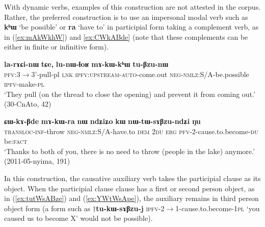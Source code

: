 \documentclass[oneside,a4paper,11pt]{article}
\newcommand{\ipa}[1]{\textbf{\phon#1}} %
\newcommand{\jpg}[2]{\ipa{#1} `#2'} %
\newcommand{\refb}[1]{(\ref{#1})}
\begin{document}

With dynamic verbs, examples of this construction are not attested in the corpus. Rather, the preferred construction is to use an impersonal modal verb such as \jpg{kʰɯ}{be possible} or  \jpg{ra}{have to} in participial form taking a complement verb, as in \refb{ex:mAkWkhW} and \ref{ex:CWkABde} (note that these complements can be either in finite or infinitive form).

 \begin{exe}
\ex  \label{ex:mAkWkhW}
\gll 
\ipa{la-rɤɕi-nɯ} 	\ipa{tɕe,} 	\ipa{lu-nɯ-ɬoʁ} 	\ipa{mɤ-kɯ-kʰɯ} 	\ipa{tu-βzu-nɯ} \\
\textsc{pfv}:3$\rightarrow$3'-pull-pl \textsc{lnk} \textsc{ipfv:upstream-auto}-come.out \textsc{neg-nmlz}:S/A-be.possible \textsc{ipfv}-make-\textsc{pl} \\
\glt `They pull (on the thread to close the opening) and prevent it from coming out.' (30-CnAto, 42)
\end{exe}
   
   
\begin{exe}
\ex  \label{ex:CWkABde}
\gll
   \ipa{ɕɯ-kɤ-βde} 	\ipa{mɤ-kɯ-ra} 	\ipa{nɯ} 	\ipa{ndʑiʑo} 	\ipa{kɯ} 	\ipa{nɯ-tɯ-sɤβzu-ndʑi} 	\ipa{ŋu} \\
\textsc{transloc-inf}-throw  \textsc{neg-nmlz}:S/A-have.to \textsc{dem} \textsc{2du} \textsc{erg} \textsc{pfv}-2-cause.to.become-\textsc{du} be:\textsc{fact} \\
\glt  `Thanks to both of you, there is no need to throw (people in the lake) anymore.' (2011-05-nyima, 191)
\end{exe}

In this construction, the causative auxiliary verb takes the participial clause  as its object. When the participial clause clause has a first or second person object, as in \refb{ex:tutWsABze} and \refb{ex:YWtWsApe}, the auxiliary remains in third person object form (a form such as $\dagger$\ipa{tu-kɯ-sɤβzu-j} \textsc{ipfv}-2$\rightarrow$1-cause.to.become-\textsc{1pl}  `you caused us to become X' would not be possible).
\end{document}
